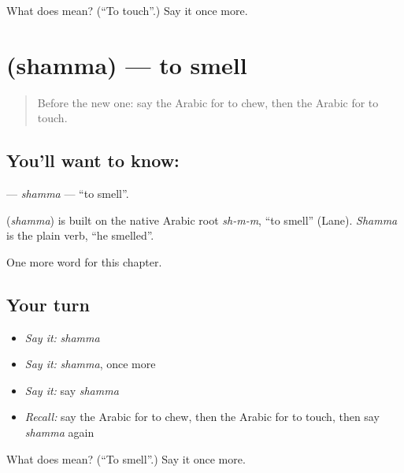 \begin{tcolorbox}[breakable,colback=teal!4,colframe=teal!35!black,title={Before you move on}]
What does  mean? (\textquotedblleft{}To touch\textquotedblright{}.) Say it once more.
\end{tcolorbox}
\section[\texorpdfstring{\ar{شم} (shamma)}{شم (shamma)}]{ (shamma) — to smell}

\label{lesson:AR-C194-shamma}



\begin{quote}
Before the new one: say the Arabic for to chew, then the Arabic for to touch.
\end{quote}

\subsection*{You'll want to know: }
\textbf{} — \emph{shamma} — \textquotedblleft{}to smell\textquotedblright{}.

\begin{cousinweb}
\textbf{} (\emph{shamma}) is built on the native Arabic root \emph{sh-m-m}, \textquotedblleft{}to smell\textquotedblright{} (Lane). \emph{Shamma} is the plain verb, \textquotedblleft{}he smelled\textquotedblright{}.
\end{cousinweb}

\begin{grammarlens}[title={What you've built}]
One more word for this chapter.
\end{grammarlens}

\subsection*{Your turn}
\begin{itemize}
\raggedright
  \item \emph{Say it:} \emph{shamma}
  \item \emph{Say it:} \emph{shamma}, once more
  \item \emph{Say it:} say \emph{shamma}
  \item \emph{Recall:} say the Arabic for to chew, then the Arabic for to touch, then say \emph{shamma} again
\end{itemize}

\begin{tcolorbox}[breakable,colback=teal!4,colframe=teal!35!black,title={Before you move on}]
What does  mean? (\textquotedblleft{}To smell\textquotedblright{}.) Say it once more.
\end{tcolorbox}
